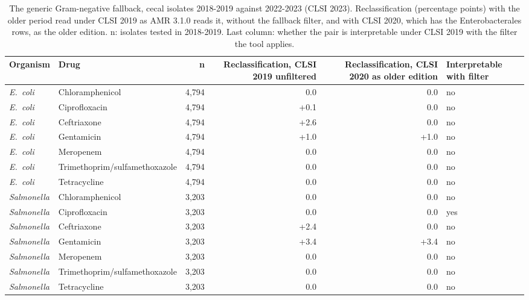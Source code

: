 \begin{table}[h]
\centering
\scriptsize
\begin{tabular}{llrrrl}
\toprule
Organism & Drug & n & Reclassification, CLSI 2019 unfiltered & Reclassification, CLSI 2020 as older edition & Interpretable with filter \\
\midrule
\textit{E.~coli} & Chloramphenicol & 4,794 & 0.0 & 0.0 & no \\
\textit{E.~coli} & Ciprofloxacin & 4,794 & +0.1 & 0.0 & no \\
\textit{E.~coli} & Ceftriaxone & 4,794 & +2.6 & 0.0 & no \\
\textit{E.~coli} & Gentamicin & 4,794 & +1.0 & +1.0 & no \\
\textit{E.~coli} & Meropenem & 4,794 & 0.0 & 0.0 & no \\
\textit{E.~coli} & Trimethoprim/sulfamethoxazole & 4,794 & 0.0 & 0.0 & no \\
\textit{E.~coli} & Tetracycline & 4,794 & 0.0 & 0.0 & no \\
\textit{Salmonella} & Chloramphenicol & 3,203 & 0.0 & 0.0 & no \\
\textit{Salmonella} & Ciprofloxacin & 3,203 & 0.0 & 0.0 & yes \\
\textit{Salmonella} & Ceftriaxone & 3,203 & +2.4 & 0.0 & no \\
\textit{Salmonella} & Gentamicin & 3,203 & +3.4 & +3.4 & no \\
\textit{Salmonella} & Meropenem & 3,203 & 0.0 & 0.0 & no \\
\textit{Salmonella} & Trimethoprim/sulfamethoxazole & 3,203 & 0.0 & 0.0 & no \\
\textit{Salmonella} & Tetracycline & 3,203 & 0.0 & 0.0 & no \\
\bottomrule
\end{tabular}
\caption{The generic Gram-negative fallback, cecal isolates 2018-2019 against 2022-2023 (CLSI 2023). Reclassification (percentage points) with the older period read under CLSI 2019 as AMR 3.1.0 reads it, without the fallback filter, and with CLSI 2020, which has the Enterobacterales rows, as the older edition. n: isolates tested in 2018-2019. Last column: whether the pair is interpretable under CLSI 2019 with the filter the tool applies.}
\end{table}

